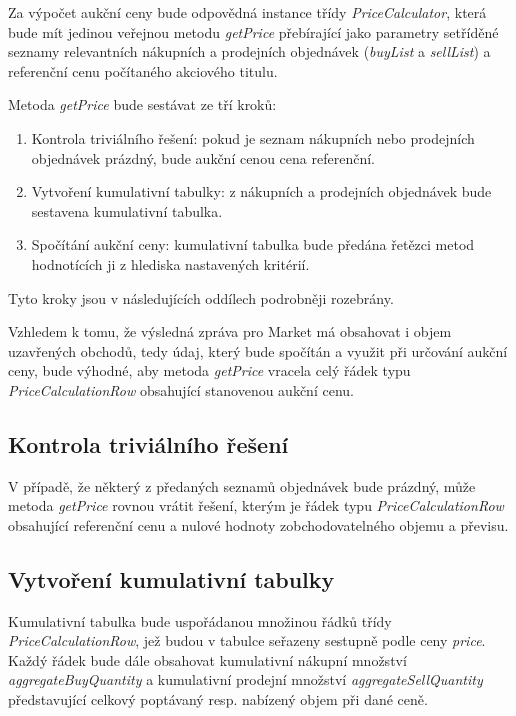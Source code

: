 \documentclass[thesis=M,czech]{FITthesis}[2012/06/26]
\begin{document}
Za výpočet aukční ceny bude odpovědná instance třídy \textit{PriceCalculator}, která bude mít jedinou veřejnou metodu \textit{getPrice}
přebírající jako parametry setříděné seznamy relevantních nákupních a prodejních objednávek (\textit{buyList} a \textit{sellList}) a 
referenční cenu počítaného akciového titulu.

Metoda \textit{getPrice} bude sestávat ze tří kroků:

\begin{enumerate}
	\item Kontrola triviálního řešení: pokud je seznam nákupních nebo prodejních objednávek prázdný, bude aukční cenou cena referenční.
	\item Vytvoření kumulativní tabulky: z nákupních a prodejních objednávek bude sestavena kumulativní tabulka. 
	\item Spočítání aukční ceny: kumulativní tabulka bude předána řetězci metod hodnotících ji z hlediska nastavených kritérií. 
\end{enumerate}
 
Tyto kroky jsou v následujících oddílech podrobněji rozebrány.

Vzhledem k tomu, že výsledná zpráva pro Market má obsahovat i objem uzavřených obchodů, tedy údaj, který bude spočítán a využit 
při určování aukční ceny, bude výhodné, aby metoda \textit{getPrice} vracela celý řádek typu \textit{PriceCalculationRow} obsahující 
stanovenou aukční cenu.


\subsection{Kontrola triviálního řešení}

V případě, že některý z předaných seznamů objednávek bude prázdný, může metoda \textit{getPrice} rovnou vrátit řešení, kterým je
řádek typu \textit{PriceCalculationRow} obsahující referenční cenu a nulové hodnoty zobchodovatelného objemu a převisu. 


\subsection{Vytvoření kumulativní tabulky}

Kumulativní tabulka bude uspořádanou množinou řádků třídy \textit{PriceCalculationRow}, jež budou v tabulce seřazeny sestupně podle
ceny \textit{price}. Každý řádek bude dále obsahovat kumulativní nákupní množství \textit{aggregateBuyQuantity} a kumulativní 
prodejní množství \textit{aggregateSellQuantity} představující celkový poptávaný resp. nabízený objem při dané ceně.
\end{document}
